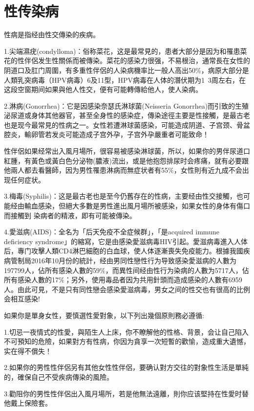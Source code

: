 \documentclass[12pt,UTF8]{ctexbook}
\begin{document}
\part{性传染病}

性病是指经由性交傳染的疾病。

1.尖端濕疣(condylloma)：俗称菜花，这是最常見的，患者大部分是因为和罹患菜花的性伴侶发生性關係而被傳染。菜花的感染力很强，不易根治，通常長在女性的阴道口及肛门周圍，有多重性伴侶的人染病機率比一般人高出50\%，病原大部分是人類乳突病毒（HPV病毒）6及11型，HPV病毒在人体的潛伏期为1~3周左右，在这段空窗期间如果與他人性交，便有可能轉傳給他人，使人染病。

2.淋病(Gonorrhea)：它是因感染奈瑟氏淋球菌(Neisseria Gonorrhea)而引致的生殖泌尿道或身体其他器官，甚至全身性的感染症，傳染途徑主要是性接觸，是最古老也是现今最常見的性病之一。女性若遭淋球菌感染，可能造成阴道、子宫颈、骨盆腔炎，輸卵管若发炎可能造成子宫外孕，子宫外孕嚴重者可能致命！

性伴侶如果经常出入風月場所，很容易被感染淋球菌，所以，如果你的男伴尿道口紅腫，有黃色或黃白色分泌物(膿液)流出，或是他抱怨排尿时会疼痛，就有必要跟他兩人都去看醫師，因为男性罹患淋病而無症状者有55\%，女性則有近九成不会出现任何症状。

3.梅毒(Syphilis)：这是最古老也是至今仍舊存在的性病，主要经由性交接觸，也可能经由輸血感染，但絕大多數是男性進出風月場所被感染，如果女性的身体有傷口而接觸到
染病者的精液，即有可能被傳染。

4.愛滋病(AIDS)：全名为「后天免疫不全症候群」，「是acquired immune deficiency syndrome」的縮寫，它是由感染愛滋病毒HIV引起。愛滋病毒進入人体后，專门攻擊人類CD4淋巴細胞的白血球，使人体逐漸喪失免疫能力。根據我國疾病管制局2016年10月份的統計，经由男同性戀性行为导致感染愛滋病的人數为197799人，佔所有感染人數的59\%，而異性间经由性行为染病的人數为5717人，佔所有感染人數的17\%；另外，使用毒品者因为共用針頭而造成感染的人數有6959人。由此可見，不是只有同性戀会感染愛滋病毒，男女之间的性交也有很高的比例会相互感染!

如果你是單身女性，要慎選性愛對象，以下列出幾個原則務必遵循:

1.切忌一夜情式的性愛，與陌生人上床，你不瞭解他的性格、背景，会让自己陷入不可預知的危險，如果對方有性病，你因为貪享一次短暫的歡愉，造成重大遺憾，实在得不償失！

2.如果你的男性性伴侶另有其他女性性伴侶，要确认對方交往的對象性生活是單純的，確保自己不受疾病傳染的風險。

3.勸阻你的男性性伴侶出入風月場所，若是他無法遠離，則你应该堅持在性愛时替他戴上保險套。
\end{document}
